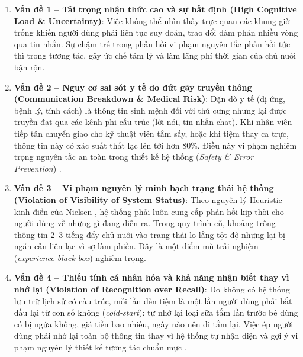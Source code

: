 \begin{enumerate}
    \item \textbf{Vấn đề 1 -- Tải trọng nhận thức cao và sự bất định (High Cognitive Load \& Uncertainty)}:
    Việc không thể nhìn thấy trực quan các khung giờ trống khiến người dùng phải liên tục suy đoán, trao đổi đàm phán nhiều vòng qua tin nhắn. Sự chậm trễ trong phản hồi vi phạm nguyên tắc phản hồi tức thì trong tương tác, gây ức chế tâm lý và làm lãng phí thời gian của chủ nuôi bận rộn.
    \item \textbf{Vấn đề 2 -- Nguy cơ sai sót y tế do đứt gãy truyền thông (Communication Breakdown \& Medical Risk)}:
    Dặn dò y tế (dị ứng, bệnh lý, tính cách) là thông tin sinh mệnh đối với thú cưng nhưng lại được truyền đạt qua các kênh phi cấu trúc (lời nói, tin nhắn chat). Khi nhân viên tiếp tân chuyển giao cho kỹ thuật viên tắm sấy, hoặc khi tiệm thay ca trực, thông tin này có xác suất thất lạc lên tới hơn 80\%. Điều này vi phạm nghiêm trọng nguyên tắc an toàn trong thiết kế hệ thống (\textit{Safety \& Error Prevention}) \cite{norman2013design}.
    \item \textbf{Vấn đề 3 -- Vi phạm nguyên lý minh bạch trạng thái hệ thống (Violation of Visibility of System Status)}:
    Theo nguyên lý Heuristic kinh điển của Nielsen \cite{nielsen10heuristics}, hệ thống phải luôn cung cấp phản hồi kịp thời cho người dùng về những gì đang diễn ra. Trong quy trình cũ, khoảng trống thông tin 2--3 tiếng đẩy chủ nuôi vào trạng thái lo lắng tột độ nhưng lại bị ngăn cản liên lạc vì sợ làm phiền. Đây là một điểm mù trải nghiệm (\textit{experience black-box}) nghiêm trọng.
    \item \textbf{Vấn đề 4 -- Thiếu tính cá nhân hóa và khả năng nhận biết thay vì nhớ lại (Violation of Recognition over Recall)}:
    Do không có hệ thống lưu trữ lịch sử có cấu trúc, mỗi lần đến tiệm là một lần người dùng phải bắt đầu lại từ con số không (\textit{cold-start}): tự nhớ lại loại sữa tắm lần trước bé dùng có bị ngứa không, giá tiền bao nhiêu, ngày nào nên đi tắm lại. Việc ép người dùng phải nhớ lại toàn bộ thông tin thay vì hệ thống tự nhận diện và gợi ý vi phạm nguyên lý thiết kế tương tác chuẩn mực \cite{sharp2019interaction}.
\end{enumerate}
